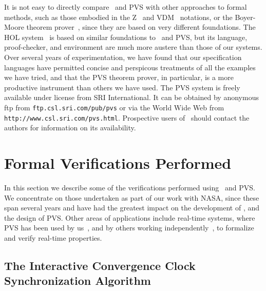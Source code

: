 It is not easy to directly compare \ehdm\ and PVS with other
approaches to formal methods, such as those embodied in the
Z~\cite{Z-notation} and VDM~\cite{Jones:VDM}
notations, or the Boyer-Moore theorem
prover~\cite{Boyer-Moore79,Boyer-Moore88}, since they are based on
very different foundations.  The HOL system~\cite{Gordon&Melham:HOL}
is based on similar
foundations to \ehdm\ and PVS, but its language, proof-checker, and
environment are much more austere than those of our systems.  Over
several years of experimentation, we have found that our
specification languages have permitted concise and perspicous
treatments of all the examples we have tried, and that the PVS
theorem prover, in particular, is a more productive instrument than
others we have used.  The PVS system is freely available under
license from SRI International.  It can be obtained by anonymous ftp
from {\tt ftp.csl.sri.com/pub/pvs} or via the World Wide Web from
{\tt http://www.csl.sri.com/pvs.html}.  Prospective users of
\ehdm\ should contact the authors for information on its
availability.

\section{Formal Verifications Performed}
\label{two}

In this section we describe some of the verifications performed using
\ehdm\ and PVS\@.  We concentrate on those undertaken as part of our
work with NASA, since these span several years and have had the
greatest impact on the development of \ehdm, and the design of PVS\@.
Other areas of applications include real-time systems, where PVS has
been used by us~\cite{Shankar93:CAV,Skakkebaek&Shankar94}, and by
others working independently~\cite{Hooman94}, to formalize and verify
real-time properties.

\subsection{The Interactive Convergence Clock Synchronization Algorithm}

